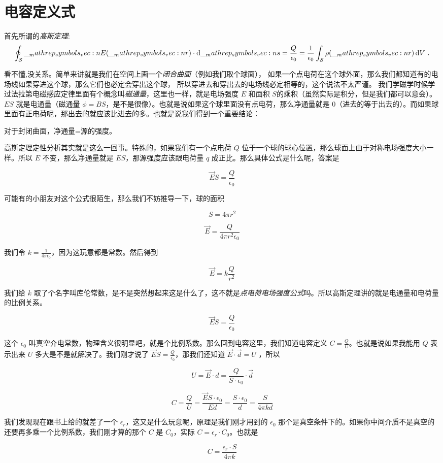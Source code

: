  \chapter{电容定义式}

 首先所谓的\emph{高斯定理}:
 \[
  \oint_{\mathcal S} \__mathrep_symbols_vec:n {E}(\__mathrep_symbols_vec:n {r})\cdot \mathop{}\!\mathrm{d} \__mathrep_symbols_vec:n {s} = \frac{Q}{\epsilon_0} = \frac{1}{\epsilon_0} \int_{\mathcal S} \rho(\__mathrep_symbols_vec:n {r}) \mathop{}\!\mathrm{d} V ~
 .\]

 看不懂,没关系。简单来讲就是我们在空间上画一个\emph{闭合曲面}（例如我们取个球面），
 如果一个点电荷在这个球外面，那么我们都知道有的电场线如果穿进这个球，那么它们也必定会穿出这个球，
 所以穿进去和穿出去的电场线必定相等的，这个说法不太严谨。
 我们学磁学时候学过法拉第电磁感应定律里面有个概念叫\emph{磁通量}，这里也一样，就是电场强度 $E$ 和面积 $S$的乘积（虽然实际是积分，但是我们都可以意会）。$ES$ 就是电通量（磁通量 $\phi=BS$，是不是很像）。也就是说如果这个球里面没有点电荷，那么净通量就是 $0$（进去的等于出去的）。而如果球里面有正电荷呢，那出去的就应该比进去的多。也就是说我们得到一个重要结论：

 对于封闭曲面，净通量=源的强度。

 高斯定理定性分析其实就是这么一回事。特殊的，如果我们有一个点电荷 $Q$ 位于一个球的球心位置，那么球面上由于对称电场强度大小一样。所以 $E$ 不变，那么净通量就是 $ES$，那源强度应该跟电荷量 $q$ 成正比。那么具体公式是什么呢，答案是

 $$
 \vec{E}S=\frac{Q}{\epsilon_0}
 $$

 可能有的小朋友对这个公式很陌生，那么我们不妨推导一下，球的面积

 $$
 S=4\pi r^2
 $$

 $$
 \vec{E}=\frac{Q}{4\pi r^2 \epsilon_0}
 $$

 我们令 $k=\frac{1}{4\pi \epsilon_0}$，因为这玩意都是常数。然后得到

 $$
 \vec{E}=k\frac{Q}{r^2}
 $$

 我们给 $k$ 取了个名字叫库伦常数，是不是突然想起来这是什么了，这不就是\emph{点电荷电场强度公式}吗。所以高斯定理讲的就是电通量和电荷量的比例关系。

 $$
 \vec{E} S=\frac{Q}{\epsilon_0}
 $$

 这个 $\epsilon_0$ 叫真空介电常数，物理含义很明显吧，就是个比例系数。那么回到电容这里，我们知道电容定义 $C=\frac QU$。也就是说如果我能用 $Q$ 表示出来 $U$ 多大是不是就解决了。我们刚才说了 $\vec{E}S=\frac{Q}{\epsilon_0}$，那我们还知道 $\vec{E} \cdot \vec{d}=U$ ，所以

 $$
 U=\vec{E}\cdot d =\frac{Q}{S\cdot \epsilon_0} \cdot \vec{d}
 $$

 $$
 C=\frac{Q}{U}=\frac{\vec{E}S\cdot \epsilon_0}{Ed}=\frac{S\cdot\epsilon_0}{d}=\frac{S}{4\pi kd}
 $$

 我们发现现在跟书上给的就差了一个 $\epsilon_r$，这又是什么玩意呢，原理是我们刚才用到的 $\epsilon_0$ 那个是真空条件下的。如果你中间介质不是真空的还要再多乘一个比例系数，我们刚才算的那个 $C$ 是 $C_0$，实际 $C=\epsilon_r\cdot C_0$。也就是

 $$
 C=\frac{\epsilon_r \cdot S}{4\pi k}
 $$
